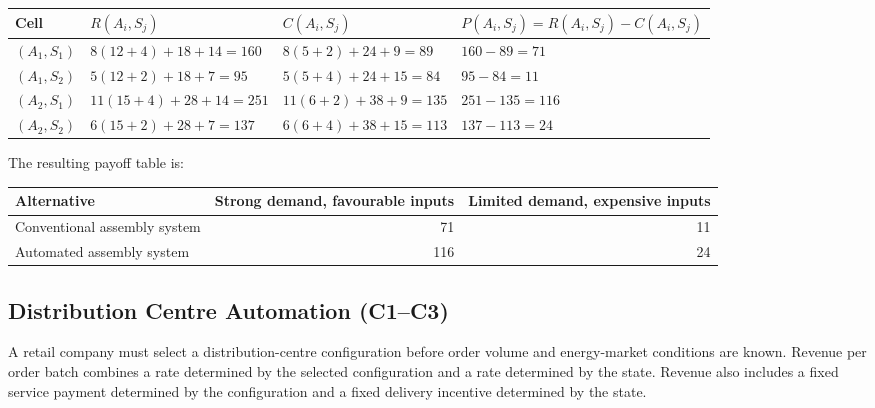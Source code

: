 \begin{center}
	\small
	\begin{tabular}{llll}
		\toprule
		Cell
		& \(R(A_i,S_j)\)
		& \(C(A_i,S_j)\)
		& \(P(A_i,S_j)=R(A_i,S_j)-C(A_i,S_j)\) \\
		\midrule
		\((A_1,S_1)\)
		& \(8(12+4)+18+14=160\)
		& \(8(5+2)+24+9=89\)
		& \(160-89=71\) \\
		
		\((A_1,S_2)\)
		& \(5(12+2)+18+7=95\)
		& \(5(5+4)+24+15=84\)
		& \(95-84=11\) \\
		
		\((A_2,S_1)\)
		& \(11(15+4)+28+14=251\)
		& \(11(6+2)+38+9=135\)
		& \(251-135=116\) \\
		
		\((A_2,S_2)\)
		& \(6(15+2)+28+7=137\)
		& \(6(6+4)+38+15=113\)
		& \(137-113=24\) \\
		\bottomrule
	\end{tabular}
\end{center}

The resulting payoff table is:

\begin{center}
	\begin{tabular}{lrr}
		\toprule
		Alternative
		& Strong demand, favourable inputs
		& Limited demand, expensive inputs \\
		\midrule
		Conventional assembly system & 71 & 11 \\
		Automated assembly system & 116 & 24 \\
		\bottomrule
	\end{tabular}
\end{center}


\subsection{Distribution Centre Automation (C1--C3)}
\label{sec:problem20-distribution-centre-automation-c1-c3}

A retail company must select a distribution-centre configuration before order
volume and energy-market conditions are known. Revenue per order batch combines
a rate determined by the selected configuration and a rate determined by the
state. Revenue also includes a fixed service payment determined by the
configuration and a fixed delivery incentive determined by the state.

